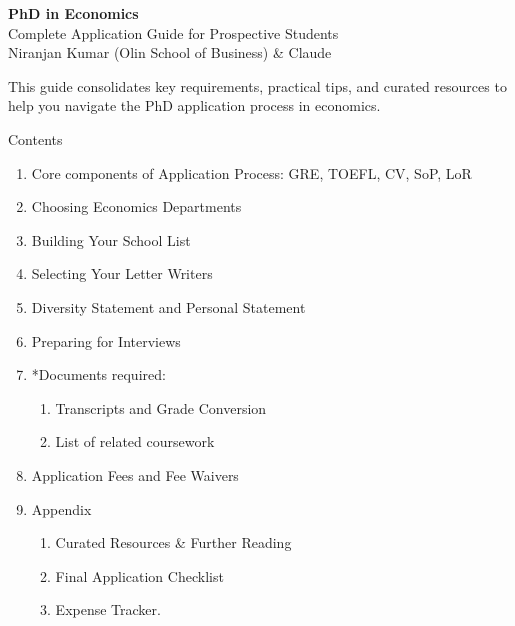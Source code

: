 \documentclass[11pt, letterpaper]{article}
\begin{document}
\color{cdarktext}

\begin{center}
\colorbox{cdark}{%
\begin{minipage}[c]{0.92\textwidth}
\vspace{14pt}
\centering
{\Huge\bfseries\color{white} PhD in Economics}\\[8pt]
{\large\color{cmedium} Complete Application Guide for Prospective Students}\\[10pt]
{\normalsize\color{white} Niranjan Kumar (Olin School of Business) \& Claude}
\vspace{14pt}
\end{minipage}%
}
\end{center}

\vspace{12pt}

This guide consolidates key requirements, practical tips, and curated resources to help you navigate the PhD application process in economics.

\vspace{6pt}

Contents
\begin{enumerate}[leftmargin=*, itemsep=1pt]
    \item Core components of Application Process: GRE, TOEFL, CV, SoP, LoR
    \item Choosing Economics Departments
    \item Building Your School List
    \item Selecting Your Letter Writers
    \item Diversity Statement and Personal Statement
    \item Preparing for Interviews
    \item *Documents required:
    \begin{enumerate}[label=\arabic{enumi}.\arabic*, itemsep=1pt]
        \item Transcripts and Grade Conversion
        \item List of related coursework
    \end{enumerate}
    \item Application Fees and Fee Waivers
    \item Appendix
    \begin{enumerate}[label=\arabic{enumi}.\arabic*, itemsep=1pt]
        \item Curated Resources \& Further Reading 
        \item Final Application Checklist 
        \item Expense Tracker.
    \end{enumerate}
\end{enumerate}
\end{document}
